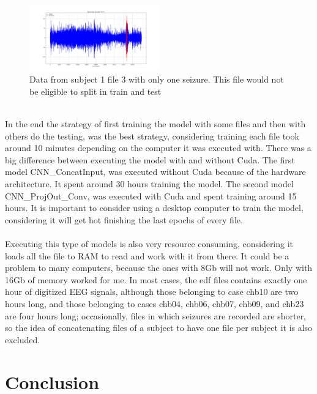 \begin{figure}[h!]
  \caption{Data from subject 1 file 3 with only one seizure. This file would not be eligible to split in train and test }
  \centering
  \includegraphics[width=0.5\textwidth]{img/1_3-elecFP1-F7.png}
\end{figure}
\leavevmode\\
In the end the strategy of first training the model with some files and then with others do the testing, was the best strategy, considering training each file took around 10 minutes depending on the computer it was executed with. There was a big difference between executing the model with and without Cuda. The first model CNN\_ConcatInput, was executed without Cuda because of the hardware architecture. It spent around 30 hours training the model. The second model CNN\_ProjOut\_Conv, was executed with Cuda and spent training around 15 hours. It is important to consider using a desktop computer to train the model, considering it will get hot finishing the last epochs of every file.
\\\\
Executing this type of models is also very resource consuming, considering it loads all the file to RAM to read and work with it from there. It could be a problem to many computers, because the ones with 8Gb will not work. Only with 16Gb of memory worked for me. In most cases, the edf files contains exactly one hour of digitized EEG signals, although those belonging to case chb10 are two hours long, and those belonging to cases chb04, chb06, chb07, chb09, and chb23 are four hours long; occasionally, files in which seizures are recorded are shorter, so the idea of concatenating files of a subject to have one file per subject it is also excluded.
\\


\section{Conclusion}
